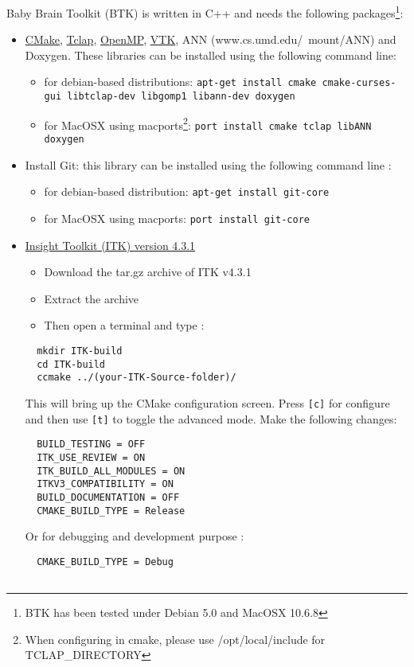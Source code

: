 \documentclass[a4paper,10pt]{article}
\begin{document}
  Baby Brain Toolkit (BTK) is written in C++ and needs the following packages\footnote{BTK has been tested under Debian 5.0 and MacOSX 10.6.8}:
  \begin{itemize}
  \item \href{http://www.cmake.org}{CMake}, \href{http://tclap.sourceforge.net}{Tclap}, \href{http://openmp.org}{OpenMP}, \href{http://www.vtk.org}{VTK}, ANN (www.cs.umd.edu/\string~mount/ANN) and Doxygen. These
  libraries can be installed using the following command line: 
  \begin{itemize}
  \item for debian-based distributions: \texttt{apt-get install cmake
  cmake-curses-gui libtclap-dev libgomp1 libann-dev doxygen}
  \item for MacOSX using macports\footnote{When configuring in cmake, please use /opt/local/include for TCLAP\_DIRECTORY}: \texttt{port install cmake tclap libANN doxygen}
  \end{itemize}
  \item Install Git: this library can be installed using the following command line : 
  \begin{itemize}
  \item for debian-based distribution: \texttt{apt-get install git-core}
  \item for MacOSX using macports: \texttt{port install git-core}
  \end{itemize}
  \item \href{http://www.itk.org/ITK/resources/software.html}{Insight Toolkit (ITK) version 4.3.1}
  \begin{itemize}
  \item Download the tar.gz archive of ITK v4.3.1
  \item Extract the archive 
  \item Then open a terminal and type :
  \end{itemize}
  \begin{verbatim}
  mkdir ITK-build
  cd ITK-build
  ccmake ../(your-ITK-Source-folder)/
  \end{verbatim}
  This will bring up the CMake configuration screen. Press \texttt{[c]} for
  configure and then use \texttt{[t]} to toggle the advanced mode. Make the
  following changes:
  \begin{verbatim}
  BUILD_TESTING = OFF
  ITK_USE_REVIEW = ON
  ITK_BUILD_ALL_MODULES = ON
  ITKV3_COMPATIBILITY = ON
  BUILD_DOCUMENTATION = OFF
  CMAKE_BUILD_TYPE = Release
  \end{verbatim}
  Or for debugging and development purpose :
  \begin{verbatim}
  CMAKE_BUILD_TYPE = Debug


\end{verbatim}
\end{itemize}
\end{document}
